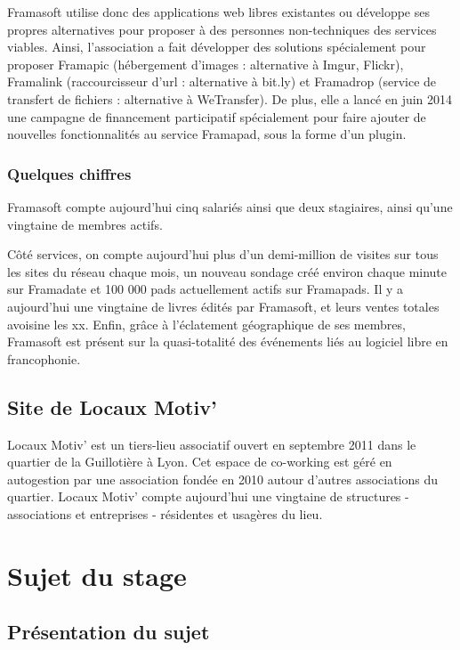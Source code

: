 \documentclass[10pt,a4paper, twoside]{report}
\begin{document}
	Framasoft utilise donc des applications web libres existantes ou développe ses propres alternatives pour proposer à des personnes non-techniques des services viables.
	Ainsi, l'association a fait développer des solutions spécialement pour proposer Framapic (hébergement d'images : alternative à Imgur, Flickr), Framalink (raccourcisseur d'url : alternative à bit.ly) et Framadrop (service de transfert de fichiers : alternative à WeTransfer). De plus, elle a lancé en juin 2014 une campagne de financement participatif spécialement pour faire ajouter de nouvelles fonctionnalités au service Framapad, sous la forme d'un plugin.
	
	\subsection{Quelques chiffres}
	Framasoft compte aujourd'hui cinq salariés ainsi que deux stagiaires, ainsi qu'une vingtaine de membres actifs. 
	
	Côté services, on compte aujourd'hui plus d'un demi-million de visites sur tous les sites du réseau chaque mois, un nouveau sondage créé environ chaque minute sur Framadate et 100 000 pads actuellement actifs sur Framapads. Il y a aujourd'hui une vingtaine de livres édités par Framasoft, et leurs ventes totales avoisine les xx. Enfin, grâce à l'éclatement géographique de ses membres, Framasoft est présent sur la quasi-totalité des événements liés au logiciel libre en francophonie.
	
	\section{Site de Locaux Motiv'}
	Locaux Motiv' est un tiers-lieu associatif ouvert en septembre 2011 dans le quartier de la Guillotière à Lyon. Cet espace de co-working est géré en autogestion par une association fondée en 2010 autour d'autres associations du quartier. Locaux Motiv' compte aujourd’hui une vingtaine de structures - associations et entreprises - résidentes et usagères du lieu.
	
	\chapter{Sujet du stage}
	
	\section{Présentation du sujet}
	
\end{document}
